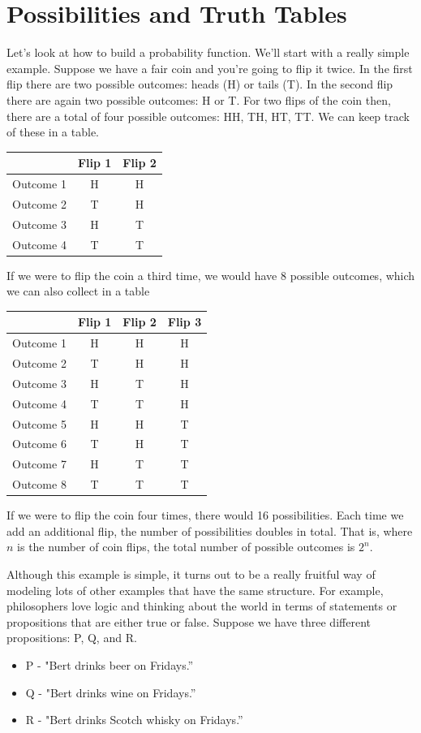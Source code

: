 \documentclass[]{tufte-book}
\providecommand{\tightlist}{%
  \setlength{\itemsep}{0pt}\setlength{\parskip}{0pt}}
\begin{document}
\hypertarget{possibilities-and-truth-tables}{%
\section{Possibilities and Truth Tables}\label{possibilities-and-truth-tables}}

Let's look at how to build a probability function. We'll start with a really simple example. Suppose we have a fair coin and you're going to flip it twice. In the first flip there are two possible outcomes: heads (H) or tails (T). In the second flip there are again two possible outcomes: H or T. For two flips of the coin then, there are a total of four possible outcomes: HH, TH, HT, TT. We can keep track of these in a table.

\begin{longtable}[]{@{}lcc@{}}
\toprule
& Flip 1 & Flip 2\tabularnewline
\midrule
\endhead
Outcome 1 & H & H\tabularnewline
Outcome 2 & T & H\tabularnewline
Outcome 3 & H & T\tabularnewline
Outcome 4 & T & T\tabularnewline
\bottomrule
\end{longtable}

If we were to flip the coin a third time, we would have 8 possible outcomes, which we can also collect in a table

\begin{longtable}[]{@{}lccc@{}}
\toprule
& Flip 1 & Flip 2 & Flip 3\tabularnewline
\midrule
\endhead
Outcome 1 & H & H & H\tabularnewline
Outcome 2 & T & H & H\tabularnewline
Outcome 3 & H & T & H\tabularnewline
Outcome 4 & T & T & H\tabularnewline
Outcome 5 & H & H & T\tabularnewline
Outcome 6 & T & H & T\tabularnewline
Outcome 7 & H & T & T\tabularnewline
Outcome 8 & T & T & T\tabularnewline
\bottomrule
\end{longtable}

If we were to flip the coin four times, there would 16 possibilities. Each time we add an additional flip, the number of possibilities doubles in total. That is, where \(n\) is the number of coin flips, the total number of possible outcomes is \(2^n\).

Although this example is simple, it turns out to be a really fruitful way of modeling lots of other examples that have the same structure. For example, philosophers love logic and thinking about the world in terms of statements or propositions that are either true or false. Suppose we have three different propositions: P, Q, and R.

\begin{itemize}
\tightlist
\item
  P - "Bert drinks beer on Fridays.''
\item
  Q - "Bert drinks wine on Fridays.''
\item
  R - "Bert drinks Scotch whisky on Fridays.''
\end{itemize}
\end{document}
